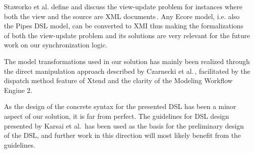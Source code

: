 Staworko et al. define and discuss the view-update problem for instances where both the view and the source are XML documents\,\cite{staworko10}. Any Ecore model, i.e. also the Pipes DSL model, can be converted to XMI thus making the formalizations of both the view-update problem and its solutions are very relevant for the future work on our synchronization logic.

The model transformations used in our solution has mainly been realized through the direct manipulation approach described by Czarnecki et al.\,\cite{czarnecki06}, facilitated by the dispatch method feature of Xtend and the clarity of the Modeling Workflow Engine 2.

As the design of the concrete syntax for the presented DSL has been a minor aspect of our solution, it is far from perfect. The guidelines for DSL design presented by Karsai et al.\,\cite{karsai09} has been used as the basis for the preliminary design of the DSL, and further work in this direction will most likely benefit from the guidelines.







